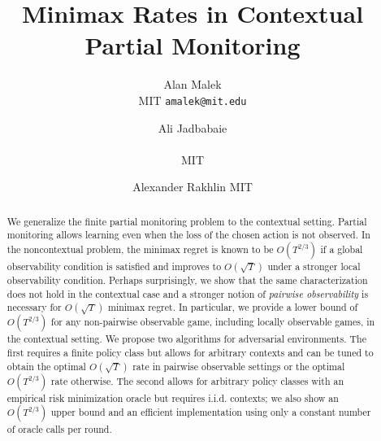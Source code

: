 \documentclass{article}
\title{Minimax Rates in Contextual Partial Monitoring}
\author{
    Alan Malek
  \\MIT
  \texttt{amalek@mit.edu}
  \and
  Ali Jadbabaie\\
  \\MIT
  \and
  Alexander Rakhlin
  MIT
}
\begin{document}

\maketitle

\begin{abstract}
  We generalize the finite partial monitoring problem to the contextual setting. Partial monitoring allows learning even when the loss of the chosen action is not observed. In the noncontextual problem, the minimax regret is known to be $O(T^{2/3})$ if a global observability condition is satisfied and improves to $O(\sqrt{T})$ under a stronger local observability condition. Perhaps surprisingly, we show that the same characterization does not hold in the contextual case and a stronger notion of \emph{pairwise observability} is necessary for $O(\sqrt{T})$ minimax regret. In particular, we provide a lower bound of $O(T^{2/3})$ for any non-pairwise observable game, including locally observable games, in the contextual setting. We propose two algorithms for adversarial environments. The first requires a finite policy class but allows for arbitrary contexts and can be tuned to obtain the optimal $O(\sqrt{T})$ rate in pairwise observable settings or the optimal $O(T^{2/3})$ rate otherwise. The second allows for arbitrary policy classes with an empirical risk minimization oracle but requires i.i.d. contexts; we also show an $O(T^{2/3})$ upper bound and an efficient implementation using only a constant number of oracle calls per round.
\end{abstract}
\end{document}
